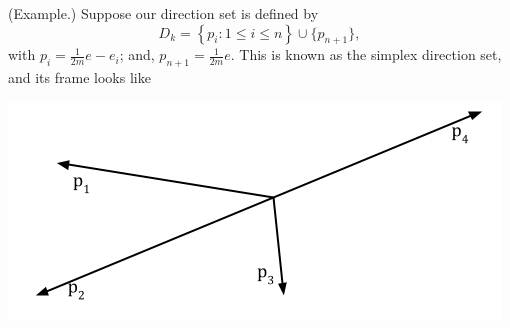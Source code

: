 \documentclass[letterpaper]{article}
\begin{document}
\begin{mdframed}
    (Example.) Suppose our direction set is defined by 
    \[D_{k} = \left\{p_i : 1 \leq i \leq n\right\} \cup \{p_{n + 1}\},\]
    with $p_i = \frac{1}{2m}e - e_i$; and, $p_{n + 1} = \frac{1}{2m} e$. This is known as the simplex direction set, and its frame looks like 
    \begin{center}
        \includegraphics[scale=0.5]{../assets/simplex_directions.png}
    \end{center}
\end{mdframed}
\end{document}
